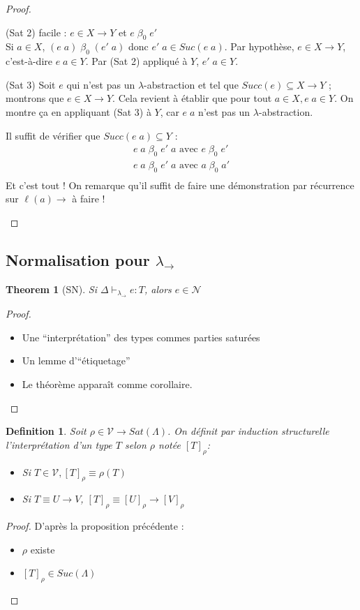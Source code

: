 \documentclass{article}
\newtheorem{thm}{Theorem}
\newtheorem{defi}{Definition}
\newcommand\tlambda[0]{$\lambda$}
\begin{document}
\begin{proof}
\begin{enumerate}[noitemsep,label=\roman*)]
(Sat 2) facile : $e\in X\to Y$ et $e\; \beta_0\; e'$\\
Si $a \in X$, $(e\; a)\; \beta_0\;(e'\; a)$ donc $e'\; a \in Suc(e\; a)$. Par hypothèse, $e\in X \to Y$, c'est-à-dire $e\; a \in Y$. Par (Sat 2) appliqué à $Y$, $e'\; a\in Y$.
\smallskip

(Sat 3) Soit $e$ qui n'est pas un \tlambda-abstraction et tel que $Succ(e)\subseteq X \to Y$ ; montrons que $e\in X \to Y$. Cela revient à établir que pour tout $a\in X, e\; a \in Y$. On montre ça en appliquant (Sat 3) à $Y$, car $e\; a$ n'est pas un \tlambda-abstraction.

Il suffit de vérifier que $Succ(e\; a)\subseteq Y$ :
\begin{align*}
e \; a \; \beta_0\; e' \; a \text{ avec } e\; \beta_0 \; e'\\
e \; a \; \beta_0\; e' \; a \text{ avec } a\; \beta_0 \; a'\\
\end{align*}
Et c'est tout !
On remarque qu'il suffit de faire une démonstration par récurrence sur $\ell (a)\to$ à faire !
\end{enumerate}
\end{proof}

\subsection{Normalisation pour $\lambda_\to$}
\begin{thm}[SN]
Si $\Delta \vdash_{\lambda_\to} e:T$, alors $e\in \mathcal{N}$
\end{thm}
\begin{proof}
\begin{itemize}[noitemsep,label=*]
\item Une ``interprétation'' des types commes parties saturées
\item Un lemme d'``étiquetage''
\item Le théorème apparaît comme corollaire.
\end{itemize}
\end{proof}

\begin{defi}
Soit $\rho \in \mathcal{V}\to Sat(\Lambda)$. On définit par induction structurelle l'interprétation d'un type $T$ selon $\rho$ notée $[T]_\rho$:
\begin{itemize}[label=*]
\item Si $T\in \mathcal{V}, [T]_\rho \equiv \rho(T)$
\item Si $T\equiv U\to V$, $[T]_\rho \equiv [U]_\rho \to [V]_\rho$
\end{itemize}
\end{defi}
\begin{proof}
D'après la proposition précédente :
\begin{itemize}[noitemsep,label=-]
\item $\rho$ existe
\item $[T]_\rho \in Suc(\Lambda)$
\end{itemize}
\end{proof}
\end{document}
